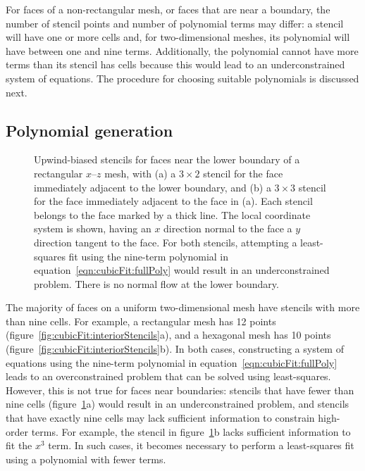 For faces of a non-rectangular mesh, or faces that are near a boundary, the number of stencil points and number of polynomial terms may differ: a stencil will have one or more cells and, for two-dimensional meshes, its polynomial will have between one and nine terms.  Additionally, the polynomial cannot have more terms than its stencil has cells because this would lead to an underconstrained system of equations.  The procedure for choosing suitable polynomials is discussed next.

\subsection{Polynomial generation}
\label{sec:cubicFit:polyGen}

\begin{figure}
	\centering
	
	\caption{Upwind-biased stencils for faces near the lower boundary of a rectangular $x$--$z$ mesh, with (a) a $3 \times 2$ stencil for the face immediately adjacent to the lower boundary, and (b) a $3 \times 3$ stencil for the face immediately adjacent to the face in (a).  Each stencil belongs to the face marked by a thick line.  The local coordinate system is shown, having an $x$ direction normal to the face a $y$ direction tangent to the face.  For both stencils, attempting a least-squares fit using the nine-term polynomial in equation~\eqref{eqn:cubicFit:fullPoly} would result in an underconstrained problem.
	There is no normal flow at the lower boundary.}
	\label{fig:cubicFit:boundaryStencils}
\end{figure}

The majority of faces on a uniform two-dimensional mesh have stencils with more than nine cells.  For example, a rectangular mesh has 12 points (figure~\ref{fig:cubicFit:interiorStencils}a), and a hexagonal mesh has 10 points (figure~\ref{fig:cubicFit:interiorStencils}b).
In both cases, constructing a system of equations using the nine-term polynomial in equation~\eqref{eqn:cubicFit:fullPoly} leads to an overconstrained problem that can be solved using least-squares.
However, this is not true for faces near boundaries: stencils that have fewer than nine cells (figure~\ref{fig:cubicFit:boundaryStencils}a) would result in an underconstrained problem, and stencils that have exactly nine cells may lack sufficient information to constrain high-order terms.
For example, the stencil in figure~\ref{fig:cubicFit:boundaryStencils}b lacks sufficient information to fit the $x^3$ term.  In such cases, it becomes necessary to perform a least-squares fit using a polynomial with fewer terms.

